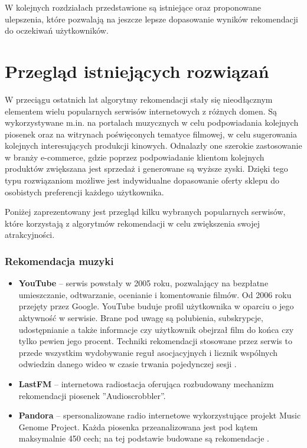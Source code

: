 \documentclass[twoside]{iisthesis}
\begin{document}
	 
	 W kolejnych rozdziałach przedstawione są istniejące oraz proponowane ulepszenia, które pozwalają na jeszcze lepsze dopasowanie wyników rekomendacji do oczekiwań użytkowników. 
	 
	 
 
 \chapter{Przegląd istniejących rozwiązań}

	 W przeciągu ostatnich lat algorytmy rekomendacji stały się nieodłącznym elementem wielu popularnych serwisów internetowych z różnych domen. Są wykorzystywane m.in. na portalach muzycznych w celu podpowiadania kolejnych piosenek oraz na witrynach poświęconych tematyce filmowej, w celu sugerowania kolejnych interesujących produkcji kinowych. Odnalazły one szerokie zastosowanie w branży e-commerce, gdzie poprzez podpowiadanie klientom kolejnych produktów zwiększana jest sprzedaż i generowane są wyższe zyski. Dzięki tego typu rozwiązaniom możliwe jest indywidualne dopasowanie oferty sklepu do osobistych preferencji każdego użytkownika. 
	 
	 Poniżej zaprezentowany jest przegląd kilku wybranych popularnych serwisów, które korzystają z algorytmów rekomendacji w celu zwiększenia swojej atrakcyjności.
	  
	 \subsection{Rekomendacja muzyki}
	 
	 \begin{itemize}
	 	\item \textbf{YouTube} -- serwis powstały w 2005 roku, pozwalający na bezpłatne umieszczanie, odtwarzanie, ocenianie i komentowanie filmów. Od 2006 roku przejęty przez Google. YouTube buduje profil użytkownika w oparciu o jego aktywność w serwisie. Brane pod uwagę są polubienia, subskrypcje, udostępnianie a także informacje czy użytkownik obejrzał film do końca czy tylko pewien jego procent. Techniki rekomendacji stosowane przez serwis to przede wszystkim wydobywanie reguł asocjacyjnych i licznik wspólnych odwiedzin danego wideo w czasie trwania pojedynczej sesji \cite{id:TheYouTubeVideoRecommendationSystem}. 
	 	\item \textbf{LastFM } -- internetowa radiostacja oferująca rozbudowany mechanizm rekomendacji piosenek ''Audioscrobbler''.   
	 	\item \textbf{Pandora}	-- spersonalizowane radio internetowe wykorzystujące projekt Music Genome Project. Każda piosenka przeanalizowana jest pod kątem maksymalnie 450 cech; na tej podstawie budowane są rekomendacje \cite{id:mgp}.
	 	
	 \end{itemize}
	 
\end{document}
